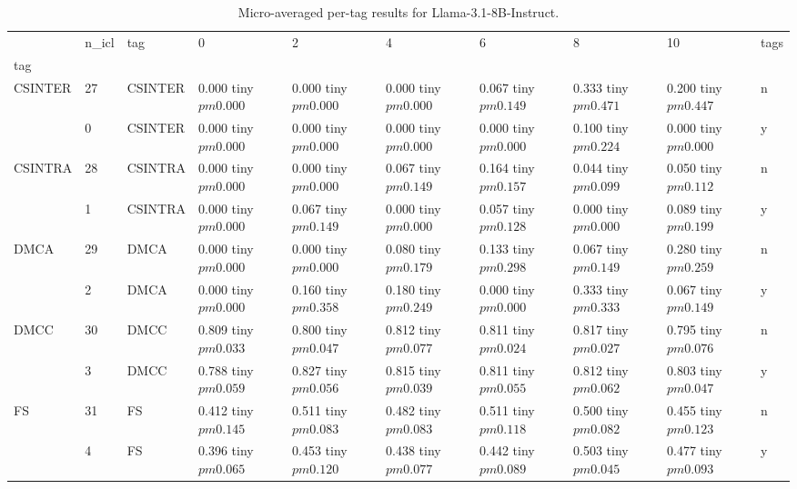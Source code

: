 \begin{table}
\caption{Micro-averaged per-tag results for Llama-3.1-8B-Instruct.}
\label{results_micro}
\begin{tabular}{llllllllll}
\toprule
 & n_icl & tag & 0 & 2 & 4 & 6 & 8 & 10 & tags \\
tag &  &  &  &  &  &  &  &  &  \\
\midrule
\multirow[t]{2}{*}{CSINTER} & 27 & CSINTER & 0.000 tiny $ pm 0.000$ & 0.000 tiny $ pm 0.000$ & 0.000 tiny $ pm 0.000$ & 0.067 tiny $ pm 0.149$ & 0.333 tiny $ pm 0.471$ & 0.200 tiny $ pm 0.447$ & n \\
 & 0 & CSINTER & 0.000 tiny $ pm 0.000$ & 0.000 tiny $ pm 0.000$ & 0.000 tiny $ pm 0.000$ & 0.000 tiny $ pm 0.000$ & 0.100 tiny $ pm 0.224$ & 0.000 tiny $ pm 0.000$ & y \\
\cline{1-10}
\multirow[t]{2}{*}{CSINTRA} & 28 & CSINTRA & 0.000 tiny $ pm 0.000$ & 0.000 tiny $ pm 0.000$ & 0.067 tiny $ pm 0.149$ & 0.164 tiny $ pm 0.157$ & 0.044 tiny $ pm 0.099$ & 0.050 tiny $ pm 0.112$ & n \\
 & 1 & CSINTRA & 0.000 tiny $ pm 0.000$ & 0.067 tiny $ pm 0.149$ & 0.000 tiny $ pm 0.000$ & 0.057 tiny $ pm 0.128$ & 0.000 tiny $ pm 0.000$ & 0.089 tiny $ pm 0.199$ & y \\
\cline{1-10}
\multirow[t]{2}{*}{DMCA} & 29 & DMCA & 0.000 tiny $ pm 0.000$ & 0.000 tiny $ pm 0.000$ & 0.080 tiny $ pm 0.179$ & 0.133 tiny $ pm 0.298$ & 0.067 tiny $ pm 0.149$ & 0.280 tiny $ pm 0.259$ & n \\
 & 2 & DMCA & 0.000 tiny $ pm 0.000$ & 0.160 tiny $ pm 0.358$ & 0.180 tiny $ pm 0.249$ & 0.000 tiny $ pm 0.000$ & 0.333 tiny $ pm 0.333$ & 0.067 tiny $ pm 0.149$ & y \\
\cline{1-10}
\multirow[t]{2}{*}{DMCC} & 30 & DMCC & 0.809 tiny $ pm 0.033$ & 0.800 tiny $ pm 0.047$ & 0.812 tiny $ pm 0.077$ & 0.811 tiny $ pm 0.024$ & 0.817 tiny $ pm 0.027$ & 0.795 tiny $ pm 0.076$ & n \\
 & 3 & DMCC & 0.788 tiny $ pm 0.059$ & 0.827 tiny $ pm 0.056$ & 0.815 tiny $ pm 0.039$ & 0.811 tiny $ pm 0.055$ & 0.812 tiny $ pm 0.062$ & 0.803 tiny $ pm 0.047$ & y \\
\cline{1-10}
\multirow[t]{2}{*}{FS} & 31 & FS & 0.412 tiny $ pm 0.145$ & 0.511 tiny $ pm 0.083$ & 0.482 tiny $ pm 0.083$ & 0.511 tiny $ pm 0.118$ & 0.500 tiny $ pm 0.082$ & 0.455 tiny $ pm 0.123$ & n \\
 & 4 & FS & 0.396 tiny $ pm 0.065$ & 0.453 tiny $ pm 0.120$ & 0.438 tiny $ pm 0.077$ & 0.442 tiny $ pm 0.089$ & 0.503 tiny $ pm 0.045$ & 0.477 tiny $ pm 0.093$ & y \\

\end{tabular}
\end{table}
